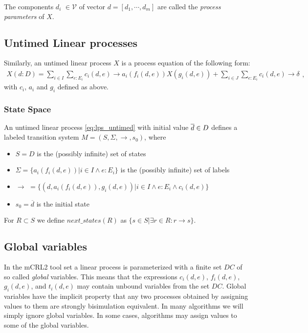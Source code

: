 \documentclass{article}
\begin{document}
The components $d_{i}$ $\in \mathcal{V}$ of vector $d=[d_{1},\cdots ,d_{m}]$
are called the \emph{process parameters} of $X$.

\subsection{Untimed Linear processes}

Similarly, an untimed linear process $X$ is a process equation of the
following form:%
\begin{equation}
\begin{array}{l}
X(d:D)=\sum\limits_{i\in I}\sum\limits_{e:E_{i}}c_{i}(d,e)\rightarrow
a_{i}(f_{i}(d,e))X(g_{i}(d,e))+\sum\limits_{i\in
J}\sum\limits_{e:E_{i}}c_{i}(d,e)\rightarrow \delta%
\end{array}%
,  \label{eq:lps_untimed}
\end{equation}%
with $c_{i}$, $a_{i}$ and $g_{i}$ defined as above.

\subsubsection{State Space}

An untimed linear process \ref{eq:lps_untimed} with initial value $\overline{%
d}\in D$ defines a labeled transition system $M=(S,\Sigma ,\rightarrow
,s_{0})$, where

\begin{itemize}
\item $S=D$ is the (possibly infinite) set of states

\item $\Sigma =\{a_{i}(f_{i}(d,e))|i\in I\wedge e:E_{i}\}$ is the (possibly
infinite) set of labels

\item $\rightarrow $ $=\{(d,a_{i}(f_{i}(d,e)),g_{i}(d,e))|i\in I\wedge
e:E_{i}\wedge c_{i}(d,e)\}$

\item $s${}$_{0}=\overline{d}$ is the initial state
\end{itemize}

For $R\subset S$ we define $next\_states(R)$ as $\{s\in S|\exists r\in
R:r\rightarrow s\}$.

\subsection{Global variables}

In the mCRL2 tool set a linear process is parameterized with a finite set $DC
$ of so called \emph{global} variables. This means that the expressions $%
c_{i}(d,e)$, $f_{i}(d,e)$, $g_{i}(d,e)$, and $t_{i}(d,e)$ may contain
unbound variables from the set $DC$. Global variables have the implicit
property that any two processes obtained by assigning values to them are
strongly bisimulation equivalent. In many algorithms we will simply ignore
global variables. In some cases, algorithms may assign values to some of the
global variables.
\end{document}
